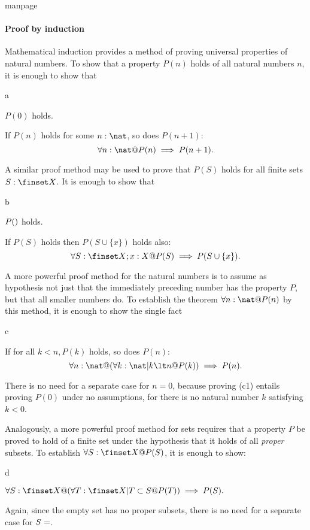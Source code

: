 \begin{pagestyle}{manpage}
\paragraph{Proof by induction}\label{p:3080}

Mathematical induction
provides a method of proving universal
properties of natural numbers. To show that a property $P(n)$
holds of all natural numbers $n$, it is enough to show that
\begin{oblig}{a}
\item $P(0)$ holds.

\item If $P(n)$ holds for some $n: \nat$, so does $P(n+1)$:
        \[ \forall n: \nat @ P(n) \implies P(n+1). \]
\end{oblig}
A similar proof method may be used to prove that $P(S)$ holds
for all finite sets $S: \finset X$. It is enough to show that
\begin{oblig}{b}
\item $P(\empty)$ holds.

\item If $P(S)$ holds then $P(S \cup \{x\})$ holds also:
        \[ \forall S: \finset X; x: X @ P(S) 
		\implies P(S \cup \{x\}). \]
\end{oblig}
A more powerful proof method for the natural numbers is to assume
as hypothesis not just that the immediately preceding number has
the property $P$, but that all smaller numbers do. To establish
the theorem $\forall n: \nat @ P(n)$ by
this method, it is enough to show the single fact
\begin{oblig}{c}
\item If for all $k \lt n, P(k)$ holds, so does $P(n)$:
        \[ \forall n: \nat @ %
                (\forall k: \nat | k \lt n @ P(k)) \implies P(n). \]
\end{oblig}
There is no need for a separate case for $n = 0$, because proving
(c1) entails proving $P(0)$ under no assumptions, for there is
no natural number $k$ satisfying $k \lt 0$.

Analogously, a more powerful proof method for sets requires that
a property $P$ be proved to hold of a finite set under the hypothesis
that it holds of all {\em proper\/} subsets. To establish
$\forall S: \finset X @ P(S)$, it is enough to show:
\begin{oblig}{d}
\item $\forall S: \finset X @ (\forall T: \finset X | T
                \subset S @ P(T)) \implies P(S).$
\end{oblig}
Again, since the empty set has no 
proper subsets, there is no
need for a separate case for $S = \empty$.
\newpage
\end{pagestyle}
